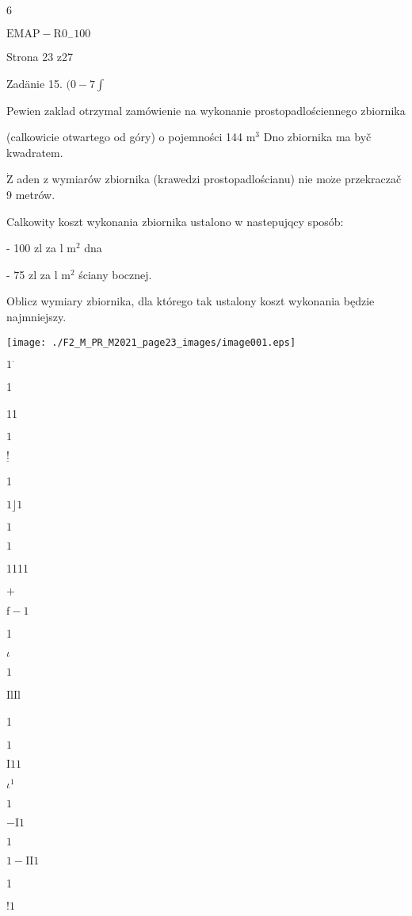 \documentclass[a4paper,12pt]{article}
\begin{document}
6

$\mathrm{E}\mathrm{M}\mathrm{A}\mathrm{P}-\mathrm{R}0_{-}100$

Strona 23 z27





Zadänie 15. $(0-7\displaystyle \int$

Pewien zaklad otrzymal zamówienie na wykonanie prostopadlościennego zbiornika

(calkowicie otwartego od góry) o pojemności 144 $\mathrm{m}^{3}$ Dno zbiornika ma byč kwadratem.

$\dot{\mathrm{Z}}$ aden z wymiarów zbiornika (krawedzi prostopadlościanu) nie $\mathrm{m}\mathrm{o}\dot{\mathrm{z}}\mathrm{e}$ przekraczač 9 metrów.

Calkowity koszt wykonania zbiornika ustalono w nastepujqcy sposób:

- 100 zl za l $\mathrm{m}^{2}$ dna

- 75 zl za l $\mathrm{m}^{2}$ ściany bocznej.

Oblicz wymiary zbiornika, dla którego tak ustalony koszt wykonania będzie najmniejszy.
\begin{center}
\texttt{[image: ./F2\_M\_PR\_M2021\_page23\_images/image001.eps]}
\end{center}
$1^{\cdot}$

1

11

$1$

$\underline{!}$

1

$1 \rfloor 1$

$1$

$1$

1111

$+$

$\mathrm{f}-1$

1

$\iota$

$1$

IlIl

1

$1$

$\mathrm{I}11$

$\iota^{1}$

$1$

$-\mathrm{I}1$

$1$

$1-\mathrm{I}\mathrm{I}1$

1

$!1$
\end{document}
